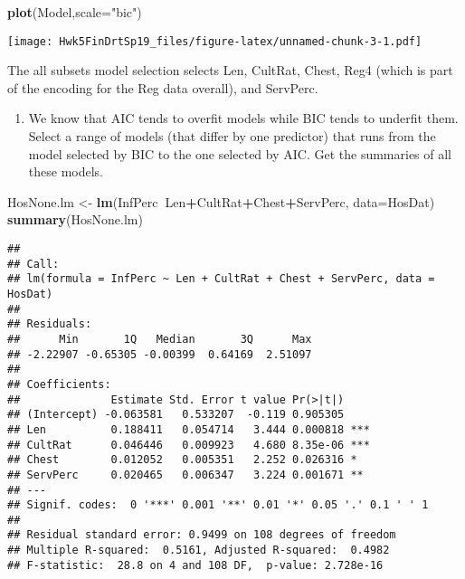 \documentclass[]{article}
\newenvironment{Shaded}{\begin{snugshade}}{\end{snugshade}}
\newcommand{\KeywordTok}[1]{\textcolor[rgb]{0.13,0.29,0.53}{\textbf{#1}}}
\newcommand{\DataTypeTok}[1]{\textcolor[rgb]{0.13,0.29,0.53}{#1}}
\newcommand{\StringTok}[1]{\textcolor[rgb]{0.31,0.60,0.02}{#1}}
\newcommand{\OperatorTok}[1]{\textcolor[rgb]{0.81,0.36,0.00}{\textbf{#1}}}
\newcommand{\NormalTok}[1]{#1}
\providecommand{\tightlist}{%
  \setlength{\itemsep}{0pt}\setlength{\parskip}{0pt}}
\begin{document}
\begin{Shaded}
\begin{Highlighting}[]
\KeywordTok{plot}\NormalTok{(Model,}\DataTypeTok{scale=}\StringTok{"bic"}\NormalTok{)}
\end{Highlighting}
\end{Shaded}

\texttt{[image: Hwk5FinDrtSp19\_files/figure-latex/unnamed-chunk-3-1.pdf]}

The all subsets model selection selects Len, CultRat, Chest, Reg4 (which
is part of the encoding for the Reg data overall), and ServPerc.

\begin{enumerate}
\def\labelenumi{\Alph{enumi})}
\setcounter{enumi}{3}
\tightlist
\item
  We know that AIC tends to overfit models while BIC tends to underfit
  them. Select a range of models (that differ by one predictor) that
  runs from the model selected by BIC to the one selected by AIC. Get
  the summaries of all these models.
\end{enumerate}

\begin{Shaded}
\begin{Highlighting}[]
\NormalTok{HosNone.lm <-}\StringTok{ }\KeywordTok{lm}\NormalTok{(InfPerc}\OperatorTok{~}\NormalTok{Len}\OperatorTok{+}\NormalTok{CultRat}\OperatorTok{+}\NormalTok{Chest}\OperatorTok{+}\NormalTok{ServPerc, }\DataTypeTok{data=}\NormalTok{HosDat)}
\KeywordTok{summary}\NormalTok{(HosNone.lm) }
\end{Highlighting}
\end{Shaded}

\begin{verbatim}
## 
## Call:
## lm(formula = InfPerc ~ Len + CultRat + Chest + ServPerc, data = HosDat)
## 
## Residuals:
##      Min       1Q   Median       3Q      Max 
## -2.22907 -0.65305 -0.00399  0.64169  2.51097 
## 
## Coefficients:
##              Estimate Std. Error t value Pr(>|t|)    
## (Intercept) -0.063581   0.533207  -0.119 0.905305    
## Len          0.188411   0.054714   3.444 0.000818 ***
## CultRat      0.046446   0.009923   4.680 8.35e-06 ***
## Chest        0.012052   0.005351   2.252 0.026316 *  
## ServPerc     0.020465   0.006347   3.224 0.001671 ** 
## ---
## Signif. codes:  0 '***' 0.001 '**' 0.01 '*' 0.05 '.' 0.1 ' ' 1
## 
## Residual standard error: 0.9499 on 108 degrees of freedom
## Multiple R-squared:  0.5161, Adjusted R-squared:  0.4982 
## F-statistic:  28.8 on 4 and 108 DF,  p-value: 2.728e-16
\end{verbatim}
\end{document}
